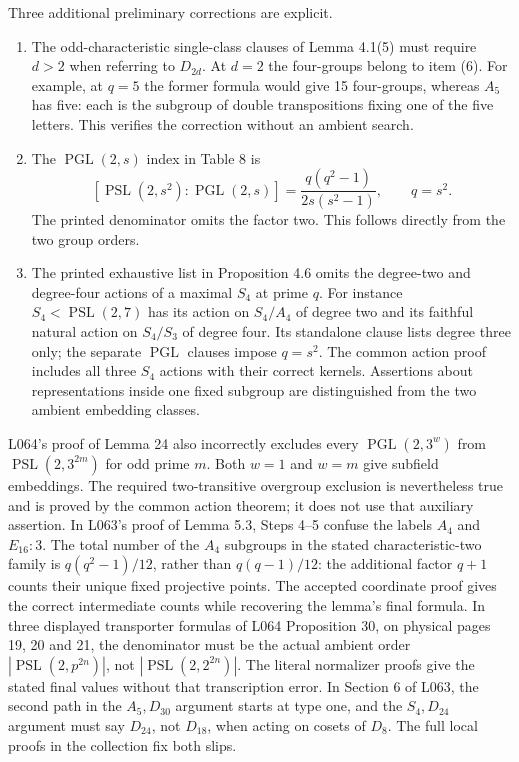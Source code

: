 \documentclass[11pt]{article}
\newcommand{\PSL}{\operatorname{PSL}}\newcommand{\PGL}{\operatorname{PGL}}
\begin{document}
Three additional preliminary corrections are explicit.
\begin{enumerate}
\item The odd-characteristic single-class clauses of Lemma 4.1(5)
must require $d>2$ when referring to $D_{2d}$. At $d=2$ the
four-groups belong to item (6). For example, at $q=5$ the former
formula would give 15 four-groups, whereas $A_5$ has five: each
is the subgroup of double transpositions fixing one of the five
letters. This verifies the correction without an ambient search.
\item The $\PGL(2,s)$ index in Table 8 is
\[
 [\PSL(2,s^2):\PGL(2,s)]
 =\frac{q(q^2-1)}{2s(s^2-1)},\qquad q=s^2.
\]
The printed denominator omits the factor two. This follows directly
from the two group orders.
\item The printed exhaustive list in Proposition 4.6 omits the
degree-two and degree-four actions of a maximal $S_4$ at prime $q$.
For instance $S_4<\PSL(2,7)$ has its action on $S_4/A_4$ of
degree two and its faithful natural action on $S_4/S_3$ of degree
four. Its standalone clause lists degree three only; the separate
$\PGL$ clauses impose $q=s^2$. The common action proof includes
all three $S_4$ actions with their correct kernels. Assertions about
representations inside one fixed subgroup are distinguished from
the two ambient embedding classes.
\end{enumerate}

L064's proof of Lemma 24 also incorrectly excludes every
$\PGL(2,3^w)$ from $\PSL(2,3^{2m})$ for odd prime $m$.
Both $w=1$ and $w=m$ give subfield embeddings. The required
two-transitive overgroup exclusion is nevertheless true and is proved
by the common action theorem; it does not use that auxiliary assertion.
In L063's proof of Lemma 5.3, Steps 4--5 confuse the labels $A_4$
and $E_{16}:3$. The total number of the $A_4$ subgroups in the
stated characteristic-two family is $q(q^2-1)/12$, rather than
$q(q-1)/12$: the additional factor $q+1$ counts their unique
fixed projective points. The accepted coordinate proof gives the
correct intermediate counts while recovering the lemma's final formula.
In three displayed transporter formulas of L064 Proposition 30,
on physical pages 19, 20 and 21, the denominator must be the actual
ambient order $|\PSL(2,p^{2n})|$, not
$|\PSL(2,2^{2n})|$. The literal normalizer proofs give the stated
final values without that transcription error.
In Section 6 of L063, the second path in the $A_5,D_{30}$ argument
starts at type one, and the $S_4,D_{24}$ argument must say $D_{24}$,
not $D_{18}$, when acting on cosets of $D_8$. The full local proofs
in the collection fix both slips.
\end{document}
